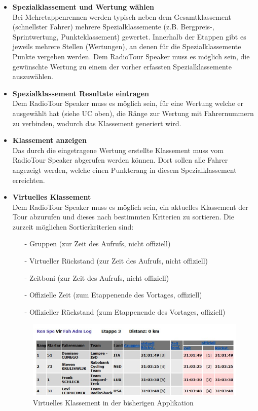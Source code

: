 \begin{itemize}
\item \textbf{Spezialklassement und Wertung wählen}\\
Bei Mehretappenrennen werden typisch neben dem Gesamtklassement (schnellster Fahrer) mehrere Spezialklassemente (z.B. Bergpreis-, Sprintwertung, Punkteklassement) gewertet. Innerhalb der Etappen gibt es jeweils mehrere Stellen (Wertungen), an denen für die Spezialklassemente Punkte vergeben werden. Dem RadioTour Speaker muss es möglich sein, die gewünschte Wertung zu einem der vorher erfassten Spezialklassemente auszuwählen.

\item \textbf{Spezialklassement Resultate eintragen}\\
Dem RadioTour Speaker muss es möglich sein, für eine Wertung welche er ausgewählt hat (siehe UC oben), die Ränge zur Wertung mit Fahrernummern zu verbinden, wodurch das Klassement generiert wird.

\item \textbf{Klassement anzeigen}\\
Das durch die eingetragene Wertung erstellte Klassement muss vom RadioTour Speaker abgerufen werden können. Dort sollen alle Fahrer angezeigt werden, welche einen Punkterang in diesem Spezialklassement erreichten.

\item \textbf{Virtuelles Klassement}\\
Dem RadioTour Speaker muss es möglich sein, ein aktuelles Klassement der Tour abzurufen und dieses nach bestimmten Kriterien zu sortieren. Die zurzeit möglichen Sortierkriterien sind:
\begin{itemize}
\item[-]Gruppen (zur Zeit des Aufrufs, nicht offiziell)
\item[-]Virtueller Rückstand (zur Zeit des Aufrufs, nicht offiziell)
\item[-]Zeitboni (zur Zeit des Aufrufs, nicht offiziell)
\item[-]Offizielle Zeit (zum Etappenende des Vortages, offiziell)
\item[-]Offizieller Rückstand (zum Etappenende des Vortages, offiziell)
\end{itemize}

\begin{figure}[h!]
  \caption{Virtuelles Klassement in der bisherigen Applikation}

  \begin{center}
    \includegraphics{05bericht/images/uc05_virtuell.png}
  \end{center}
\end{figure}


\end{itemize}

